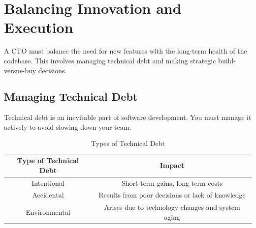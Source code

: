 \section{Balancing Innovation and Execution}

A \gls{CTO} must balance the need for new features with the long-term health of the codebase. This involves managing technical debt and making strategic build-versus-buy decisions.

\subsection{Managing Technical Debt}

Technical debt is an inevitable part of software development. You must manage it actively to avoid slowing down your team.

\begin{table}[h]
    \centering
    \begin{tabular}{|c|c|}
        \hline
        \textbf{Type of Technical Debt} & \textbf{Impact}                                   \\
        \hline
        Intentional                     & Short-term gains, long-term costs                 \\
        \hline
        Accidental                      & Results from poor decisions or lack of knowledge  \\
        \hline
        Environmental                   & Arises due to technology changes and system aging \\
        \hline
    \end{tabular}
    \caption{Types of Technical Debt}
\end{table}

